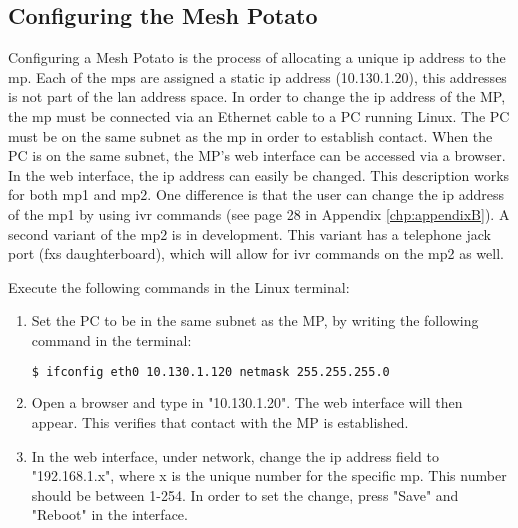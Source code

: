 \subsection{Configuring the Mesh Potato}
\label{subsec:configuring}
Configuring a Mesh Potato is the process of allocating a unique \gls{ip} address to the \gls{mp}. Each of the \glspl{mp} are assigned a static \gls{ip} address (10.130.1.20), this addresses is not part of the \gls{lan} address space. In order to change the \gls{ip} address of the MP, the \gls{mp} must be connected via an Ethernet cable to a PC running Linux. The PC must be on the same subnet as the \gls{mp} in order to establish contact. When the PC is on the same subnet, the MP's web interface can be accessed via a browser. In the web interface, the \gls{ip} address can easily be changed. This description works for both \gls{mp1} and \gls{mp2}. One difference is that the user can change the \gls{ip} address of the \gls{mp1} by using \gls{ivr} commands (see page 28 in Appendix \ref{chp:appendixB}). A second variant of the \gls{mp2} is in development. This variant has a telephone jack port (\gls{fxs} daughterboard), which will allow for \gls{ivr} commands on the \gls{mp2} as well. 

Execute the following commands in the Linux terminal:
\begin{enumerate}
\item Set the PC to be in the same subnet as the MP, by writing the following command in the terminal:
\noindent
\begin{lstlisting}[language=bash]
  $ ifconfig eth0 10.130.1.120 netmask 255.255.255.0
\end{lstlisting}
\item Open a browser and type in "10.130.1.20". The web interface will then appear. This verifies that contact with the MP is established. 
\item In the web interface, under network, change the \gls{ip} address field to "192.168.1.x", where x is the unique number for the specific \gls{mp}. This number should be between 1-254. In order to set the change, press "Save" and "Reboot" in the interface. 
\end{enumerate}

